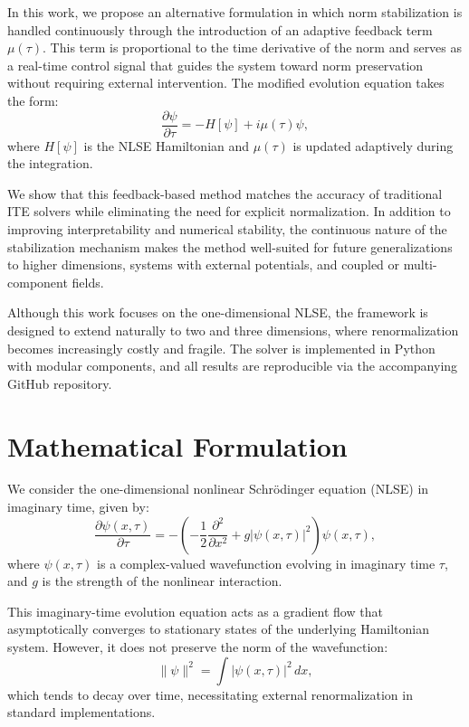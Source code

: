 \documentclass[12pt]{article}
\begin{document}
In this work, we propose an alternative formulation in which norm stabilization is handled continuously through the introduction of an adaptive feedback term $\mu(\tau)$. This term is proportional to the time derivative of the norm and serves as a real-time control signal that guides the system toward norm preservation without requiring external intervention. The modified evolution equation takes the form:
\begin{equation}
\frac{\partial \psi}{\partial \tau} = -H[\psi] + i \mu(\tau) \psi,
\end{equation}
where $H[\psi]$ is the NLSE Hamiltonian and $\mu(\tau)$ is updated adaptively during the integration.

We show that this feedback-based method matches the accuracy of traditional ITE solvers while eliminating the need for explicit normalization. In addition to improving interpretability and numerical stability, the continuous nature of the stabilization mechanism makes the method well-suited for future generalizations to higher dimensions, systems with external potentials, and coupled or multi-component fields.

Although this work focuses on the one-dimensional NLSE, the framework is designed to extend naturally to two and three dimensions, where renormalization becomes increasingly costly and fragile. The solver is implemented in Python with modular components, and all results are reproducible via the accompanying GitHub repository.
\newpage
\section{Mathematical Formulation}

We consider the one-dimensional nonlinear Schrödinger equation (NLSE) in imaginary time, given by:
\begin{equation}
\frac{\partial \psi(x,\tau)}{\partial \tau} = -\left( -\frac{1}{2} \frac{\partial^2}{\partial x^2} + g |\psi(x,\tau)|^2 \right) \psi(x,\tau),
\end{equation}
where $\psi(x,\tau)$ is a complex-valued wavefunction evolving in imaginary time $\tau$, and $g$ is the strength of the nonlinear interaction.

This imaginary-time evolution equation acts as a gradient flow that asymptotically converges to stationary states of the underlying Hamiltonian system. However, it does not preserve the norm of the wavefunction:
\[
\|\psi\|^2 = \int |\psi(x,\tau)|^2 \, dx,
\]
which tends to decay over time, necessitating external renormalization in standard implementations.
\end{document}
